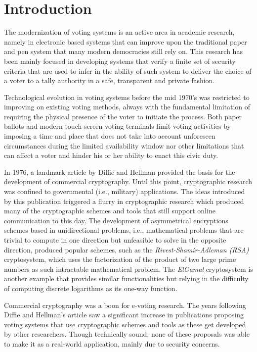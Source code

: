 \documentclass[../access.tex]{subfiles}
\begin{document}
\section{Introduction}
\label{sec:introduction}
The modernization of voting systems is an active area in academic research, namely in electronic based systems that can improve upon the traditional paper and pen system that many modern democracies still rely on. This research has been mainly focused in developing systems that verify a finite set of security criteria that are used to infer in the ability of such system to deliver the choice of a voter to a tally authority in a safe, transparent and private fashion.
\par
Technological evolution in voting systems before the mid 1970's was restricted to improving on existing voting methods, always with the fundamental limitation of requiring the physical presence of the voter to initiate the process. Both paper ballots and modern touch screen voting terminals limit voting activities by imposing a time and place that does not take into account unforeseen circumstances during the limited availability window nor other limitations that can affect a voter and hinder his or her ability to enact this civic duty.
\par
In 1976, a landmark article by Diffie and Hellman \cite{Diffie1976} provided the basis for the development of commercial cryptography. Until this point, cryptographic research was confined to governmental (i.e., military) applications. The ideas introduced by this publication triggered a flurry in cryptographic research which produced many of the cryptographic schemes and tools that still support online communication to this day. The development of asymmetrical encryptions schemes based in unidirectional problems, i.e., mathematical problems that are trivial to compute in one direction but unfeasible to solve in the opposite direction, produced popular schemes, such as the \textit{Rivest-Shamir-Adleman (RSA)} \cite{Rivest1983} cryptosystem, which uses the factorization of the product of two large prime numbers as such intractable mathematical problem. The \textit{ElGamal} cryptosystem is another example that provides similar functionalities but relying in the difficulty of computing discrete logarithms as its one-way function.
\par
Commercial cryptography was a boon for e-voting research. The years following Diffie and Hellman's article saw a significant increase in publications proposing voting systems that use cryptographic schemes and tools as these get developed by other researchers. Though technically sound, none of these proposals was able to make it as a real-world application, mainly due to security concerns.
\end{document}
